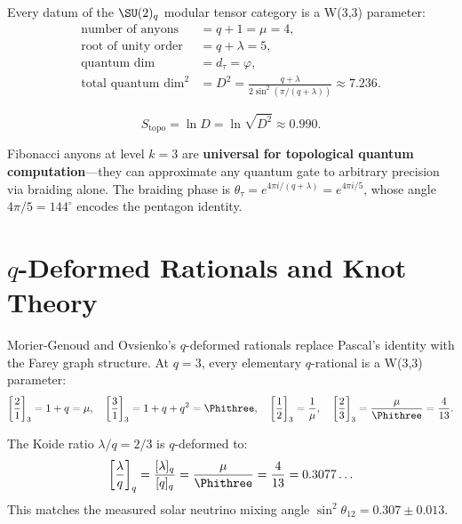 \begin{theorem}
\label{thm:modular}
Every datum of the $\SU(2)_q$ modular tensor category is a W(3,3) parameter:
\begin{align}
\text{number of anyons} &= q + 1 = \mu = 4, \\
\text{root of unity order} &= q + \lambda = 5, \\
\text{quantum dim} &= d_\tau = \varphi, \\
\text{total quantum dim}^2 &= D^2 = \frac{q+\lambda}{2\sin^2(\pi/(q{+}\lambda))}
\approx 7.236.
\end{align}
\end{theorem}

\begin{corollary}
\begin{equation}
S_{\mathrm{topo}} = \ln D = \ln\sqrt{D^2} \approx 0.990.
\end{equation}
\end{corollary}

Fibonacci anyons at level $k=3$ are \textbf{universal for topological quantum computation}---they can approximate any quantum gate to
arbitrary precision via braiding alone.
The braiding phase is $\theta_\tau = e^{4\pi i/(q+\lambda)} = e^{4\pi i/5}$,
whose angle $4\pi/5 = 144^\circ$ encodes the pentagon identity.


\section{\texorpdfstring{$q$-Deformed Rationals and Knot Theory}{q-Deformed Rationals and Knot Theory}}
\label{sec:q-rationals}

Morier-Genoud and Ovsienko's $q$-deformed rationals
replace Pascal's identity with the Farey graph structure.
At $q=3$, every elementary $q$-rational is a W(3,3) parameter:
\begin{equation}
\left[\frac{2}{1}\right]_3 = 1+q = \mu, \quad
\left[\frac{3}{1}\right]_3 = 1+q+q^2 = \Phithree, \quad
\left[\frac{1}{2}\right]_3 = \frac{1}{\mu}, \quad
\left[\frac{2}{3}\right]_3 = \frac{\mu}{\Phithree} = \frac{4}{13}.
\end{equation}

\begin{theorem}
The Koide ratio $\lambda/q = 2/3$ is $q$-deformed to:
\begin{equation}
\left[\frac{\lambda}{q}\right]_q = \frac{[\lambda]_q}{[q]_q} = \frac{\mu}{\Phithree}
= \frac{4}{13} = 0.3077\ldots
\end{equation}
This matches the measured solar neutrino mixing angle
$\sin^2\theta_{12} = 0.307\pm 0.013$.
\end{theorem}

